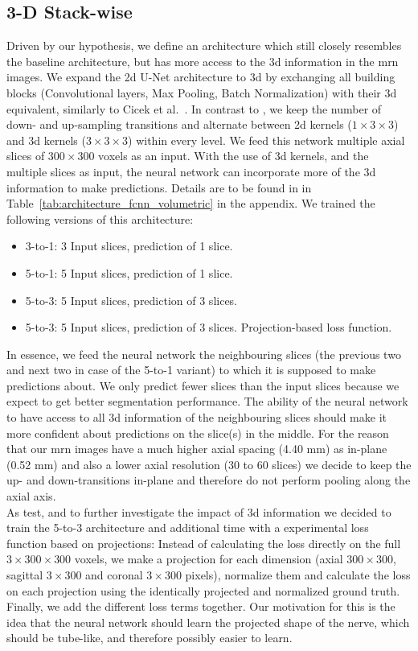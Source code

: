\subsection{3-D Stack-wise}
Driven by our hypothesis, we define an architecture which still closely resembles the baseline architecture, but has more access to the \gls{3d} information in the \gls{mrn} images.
We expand the \gls{2d} U-Net architecture to \gls{3d} by exchanging all building blocks (Convolutional layers, Max Pooling, Batch Normalization) with their \gls{3d} equivalent, similarly to Cicek et al.~\cite{Cicek20163DAnnotation}. In contrast to \cite{Cicek20163DAnnotation}, we keep the number of down- and up-sampling transitions and alternate between \gls{2d} kernels ($1 \times 3 \times 3$) and \gls{3d} kernels ($3 \times 3 \times 3$) within every level.
We feed this network multiple axial slices of $300 \times 300$ voxels as an input.
With the use of \gls{3d} kernels, and the multiple slices as input, the neural network can incorporate more of the \gls{3d} information to make predictions.
Details are to be found in in Table~\ref{tab:architecture_fcnn_volumetric} in the appendix. We trained the following versions of this architecture:
\begin{itemize}
  \item 3-to-1: 3 Input slices, prediction of 1 slice.
  \item 5-to-1: 5 Input slices, prediction of 1 slice.
  \item 5-to-3: 5 Input slices, prediction of 3 slices.
  \item 5-to-3: 5 Input slices, prediction of 3 slices. Projection-based loss function.
\end{itemize}
In essence, we feed the neural network the neighbouring slices (the previous two and next two in case of the 5-to-1 variant) to which it is supposed to make predictions about. We only predict fewer slices than the input slices because we expect to get better segmentation performance. The ability of the neural network to have access to all \gls{3d} information of the neighbouring slices should make it more confident about predictions on the slice(s) in the middle.
For the reason that our \gls{mrn} images have a much higher axial spacing (4.40 mm) as in-plane (0.52 mm) and also a lower axial resolution (30 to 60 slices) we decide to keep the up- and down-transitions in-plane and therefore do not perform pooling along the axial axis.\\
As test, and to further investigate the impact of \gls{3d} information we decided to train the 5-to-3 architecture and additional time with a experimental loss function based on projections: Instead of calculating the loss directly on the full $3 \times 300 \times 300$ voxels, we make a projection for each dimension (axial $300 \times 300$, sagittal $3 \times 300$ and coronal $3 \times 300$ pixels), normalize them and calculate the loss on each projection using the identically projected and normalized ground truth. Finally, we add the different loss terms together. Our motivation for this is the idea that the neural network should learn the projected shape of the nerve, which should be tube-like, and therefore possibly easier to learn.

